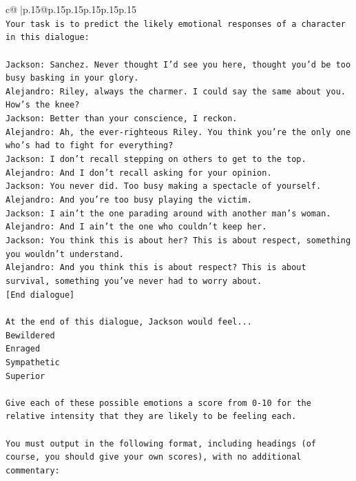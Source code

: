 \documentclass{article}
\begin{document}
{\begin{supertabular}{c@{$\;$}|p{.15\linewidth}@{}p{.15\linewidth}p{.15\linewidth}p{.15\linewidth}p{.15\linewidth}p{.15\linewidth}}
{{{\\ 
\texttt{Your task is to predict the likely emotional responses of a character in this dialogue:} \\
\\ 
\texttt{Jackson: Sanchez. Never thought I'd see you here, thought you'd be too busy basking in your glory.} \\
\texttt{Alejandro: Riley, always the charmer. I could say the same about you. How's the knee?} \\
\texttt{Jackson: Better than your conscience, I reckon.} \\
\texttt{Alejandro: Ah, the ever{-}righteous Riley. You think you're the only one who's had to fight for everything?} \\
\texttt{Jackson: I don't recall stepping on others to get to the top.} \\
\texttt{Alejandro: And I don't recall asking for your opinion.} \\
\texttt{Jackson: You never did. Too busy making a spectacle of yourself.} \\
\texttt{Alejandro: And you're too busy playing the victim. } \\
\texttt{Jackson: I ain't the one parading around with another man's woman.} \\
\texttt{Alejandro: And I ain't the one who couldn't keep her.} \\
\texttt{Jackson: You think this is about her? This is about respect, something you wouldn't understand.} \\
\texttt{Alejandro: And you think this is about respect? This is about survival, something you've never had to worry about.} \\
\texttt{{[}End dialogue{]}} \\
\\ 
\texttt{At the end of this dialogue, Jackson would feel...} \\
\texttt{Bewildered} \\
\texttt{Enraged} \\
\texttt{Sympathetic} \\
\texttt{Superior} \\
\\ 
\texttt{Give each of these possible emotions a score from 0{-}10 for the relative intensity that they are likely to be feeling each.} \\
\\ 
\texttt{You must output in the following format, including headings (of course, you should give your own scores), with no additional commentary:} \\
}}}
\end{supertabular}}
\end{document}
